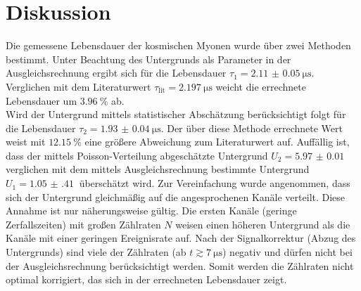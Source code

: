 \section{Diskussion}
\label{sec:Diskussion}
Die gemessene Lebensdauer der kosmischen Myonen wurde über zwei Methoden bestimmt.
Unter Beachtung des Untergrunds als Parameter in der Ausgleichsrechnung ergibt sich für die Lebensdauer $\tau_1 = \qty{2.11(5)}{\micro\second}$.
Verglichen mit dem Literaturwert $\tau_\text{lit} = \qty{2.197}{\micro\second}$\cite{pdg} weicht die errechnete Lebensdauer um $\qty{3.96}{\percent}$ ab.
\\
Wird der Untergrund mittels statistischer Abschätzung berücksichtigt folgt für die Lebensdauer $\tau_2 = \qty{1.93(4)}{\micro\second}$.
Der über diese Methode errechnete Wert weist mit $\qty{12.15}{\percent}$ eine größere Abweichung zum Literaturwert auf.
Auffällig ist, dass der mittels Poisson-Verteilung abgeschätzte Untergrund $U_2 = \qty{5.97(1)}{}$ verglichen mit dem mittels Ausgleichsrechnung bestimmte Untergrund $U_1 = \qty{1.05(41)}{}$ überschätzt wird.
Zur Vereinfachung wurde angenommen, dass sich der Untergrund gleichmäßig auf die angesprochenen Kanäle verteilt.
Diese Annahme ist nur näherungsweise gültig.
Die ersten Kanäle (geringe Zerfallszeiten) mit großen Zählraten $N$ weisen einen höheren Untergrund als die Kanäle mit einer geringen Ereignisrate auf.
Nach der Signalkorrektur (Abzug des Untergrunds) sind viele der Zählraten (ab $t \gtrsim \qty{7}{\micro\second}$) negativ und dürfen nicht bei der Ausgleichsrechnung berücksichtigt werden.
Somit werden die Zählraten nicht optimal korrigiert, das sich in der errechneten Lebensdauer zeigt.